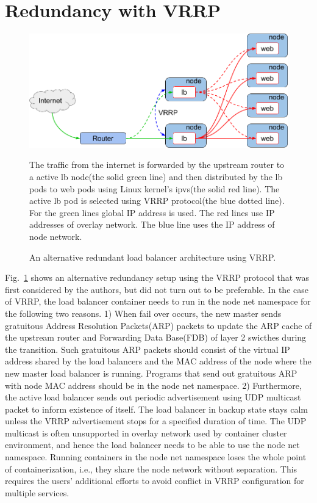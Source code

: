 
\appendix

\section{Redundancy with VRRP}\label{appendix:Redundancy with VRRP}

\begin{figure}[h]
\begin{center}
\includegraphics[width=\columnwidth]{Figs/vrrp.png}
\end{center}
\caption{ An alternative redundant load balancer architecture using VRRP.}
  The traffic from the internet is forwarded by the upstream router to a active lb node(the solid green line) and then distributed by the lb pods to web pods using Linux kernel's ipvs(the solid red line).
  The active lb pod is selected using VRRP protocol(the blue dotted line).
  For the green lines global IP address is used. The red lines use IP addresses of overlay network. The blue line uses the IP address of node network.

\label{fig:vrrp}
\end{figure}

Fig.~\ref{fig:vrrp} shows an alternative redundancy setup using the VRRP protocol that was first considered by the authors, but did not turn out to be preferable.
In the case of VRRP, the load balancer container needs to run in the node net namespace for the following two reasons.
1) When fail over occurs, the new master sends gratuitous Address Resolution Packets(ARP) packets to update the ARP cache of the upstream router and Forwarding Data Base(FDB) of layer 2 swicthes during the transition.
Such gratuitous ARP packets should consist of the virtual IP address shared by the load balancers and the MAC address of the node where the new master load balancer is running.
Programs that send out gratuitous ARP with node MAC address should be in the node net namespace.
%
2) Furthermore, the active load balancer sends out periodic advertisement using UDP multicast packet to inform existence of itself.
The load balancer in backup state stays calm unless the VRRP advertisement stops for a specified duration of time.
The UDP multicast is often unsupported in overlay network used by container cluster environment, and hence the load balancer needs to be able to use the node net namespace.
%
Running containers in the node net namespace loses the whole point of containerization, i.e., they share the node network without separation.
This requires the users' additional efforts to avoid conflict in VRRP configuration for multiple services.
%

